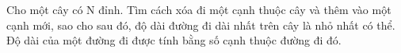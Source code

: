 Cho một cây có N đỉnh. Tìm cách xóa đi một cạnh thuộc   cây và thêm vào một cạnh mới, sao cho sau đó, độ dài đường   đi dài nhất trên cây là nhỏ nhất có thể. Độ dài của một đường   đi được tính bằng số cạnh thuộc đường đi đó.